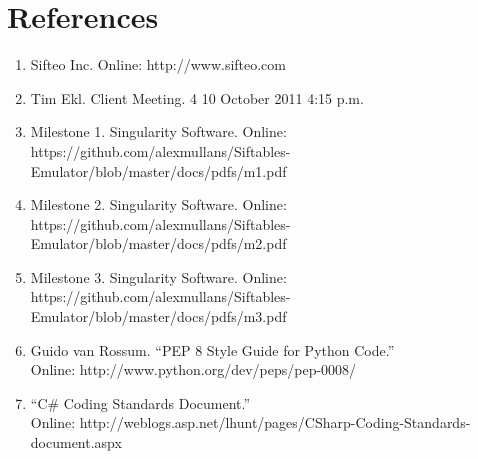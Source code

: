 \documentclass[12pt]{article}
\begin{document}
\section*{References}

        \begin{enumerate}
                \item{Sifteo Inc. Online: http://www.sifteo.com}
                \item{Tim Ekl.  Client Meeting. 4 10 October 2011 4:15 p.m.}
                \item{Milestone 1.  Singularity Software.  Online: https://github.com/alexmullans/Siftables-Emulator/blob/master/docs/pdfs/m1.pdf}
                \item{Milestone 2.  Singularity Software.  Online: https://github.com/alexmullans/Siftables-Emulator/blob/master/docs/pdfs/m2.pdf}
                \item{Milestone 3.  Singularity Software.  Online: https://github.com/alexmullans/Siftables-Emulator/blob/master/docs/pdfs/m3.pdf}
                \item{Guido van Rossum.  ``PEP 8 Style Guide for Python Code.'' \\Online: http://www.python.org/dev/peps/pep-0008/}
                \item{``C\# Coding Standards Document.'' \\Online: http://weblogs.asp.net/lhunt/pages/CSharp-Coding-Standards-document.aspx}

        \end{enumerate}

\clearpage

\printindex
\end{document}
